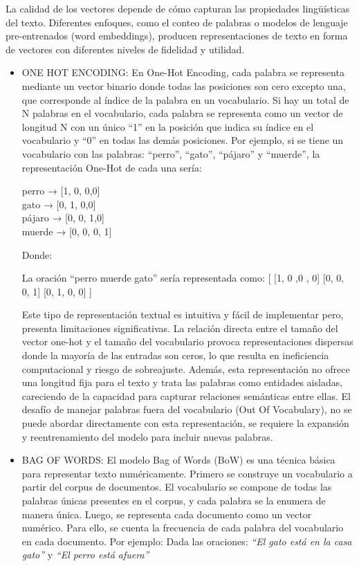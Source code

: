 \begin{itemize}
La calidad de los vectores depende de cómo capturan las propiedades lingüísticas del texto. Diferentes enfoques, como el conteo de palabras o modelos de lenguaje pre-entrenados (word embeddings), producen representaciones de texto en forma de vectores con diferentes niveles de fidelidad y utilidad.

\begin{itemize}

	\item ONE HOT ENCODING: En One-Hot Encoding, cada palabra se representa mediante un vector binario donde todas las posiciones son cero excepto una, que corresponde al índice de la palabra en un vocabulario. Si hay un total de N palabras en el vocabulario, cada palabra se representa como un vector de longitud N con un único ``1'' en la posición que indica su índice en el vocabulario y ``0'' en todas las demás posiciones. Por ejemplo, si se tiene un vocabulario con las palabras: ``perro'', ``gato'', ``pájaro'' y ``muerde'', la representación One-Hot de cada una sería:
\begin{Center}
	perro → [1, 0, 0,0]\\
	gato → [0, 1, 0,0]\\
	pájaro → [0, 0, 1,0]\\
	muerde → [0, 0, 0, 1]\\
	
\end{Center}

Donde:

La oración ``perro muerde gato'' sería representada como: [   [1, 0 ,0 , 0]   [0, 0, 0, 1]   [0, 1, 0, 0]  ]


Este tipo de representación textual  es intuitiva y fácil de implementar pero, presenta limitaciones significativas. La relación directa entre el tamaño del vector one-hot y el tamaño del vocabulario provoca representaciones dispersas donde la mayoría de las entradas son ceros, lo que resulta en ineficiencia computacional y riesgo de sobreajuste. Además, esta representación no ofrece una longitud fija para el texto y trata las palabras como entidades aisladas, careciendo de la capacidad para capturar relaciones semánticas entre ellas. El desafío de manejar palabras fuera del vocabulario (Out Of Vocabulary), no se puede abordar directamente con esta representación, se requiere la expansión y reentrenamiento del modelo para incluir nuevas palabras.

	\item BAG OF WORDS: El modelo Bag of Words (BoW) es una técnica básica  para representar texto numéricamente. Primero  se construye un vocabulario a partir del corpus de documentos. El vocabulario se compone de todas las palabras únicas presentes en el corpus, y cada palabra se la enumera de manera única. Luego, se representa cada documento como un vector numérico. Para ello, se cuenta la frecuencia de cada palabra del vocabulario en cada documento. Por ejemplo: 
Dada las oraciones: \textit{``El gato está en la casa gato''} y \textit{``El perro está afuera''}


\end{itemize}
\end{itemize}
